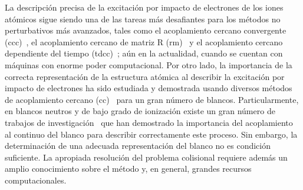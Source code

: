 La descripción precisa de la excitación por impacto de electrones de los 
iones atómicos sigue siendo una de las tareas más desafiantes para los 
métodos no perturbativos más avanzados, tales como el acoplamiento 
cercano convergente (\acs{ccc})~\cite{Bray:92}, el acoplamiento cercano 
de matriz R (\acs{rm})~\cite{Burke:75} y el acoplamiento cercano 
dependiente del tiempo (\acs{tdcc})~\cite{Pindzola:07}; aún en la 
actualidad, cuando se cuentan con máquinas con enorme poder computacional. 
Por otro lado, la importancia de la correcta representación de la 
estructura atómica al describir la excitación por impacto de electrones 
ha sido estudiada y demostrada usando diversos métodos de acoplamiento 
cercano (\acs{cc})~\cite{Bartschat:04,Zatsarinny:16,Be_Ballance:03} para 
un gran número de blancos. Particularmente, en blancos neutros y de bajo 
grado de ionización existe un gran número de trabajos de 
investigación~\cite{Ballance:03,Badnell:03,Mitnik:03} que han demostrado 
la importancia del acoplamiento al continuo del blanco para describir 
correctamente este proceso. Sin embargo, la determinación de una adecuada 
representación del blanco no es condición suficiente. La apropiada 
resolución del problema colisional requiere además un amplio conocimiento 
sobre el método y, en general, grandes recursos computacionales.



